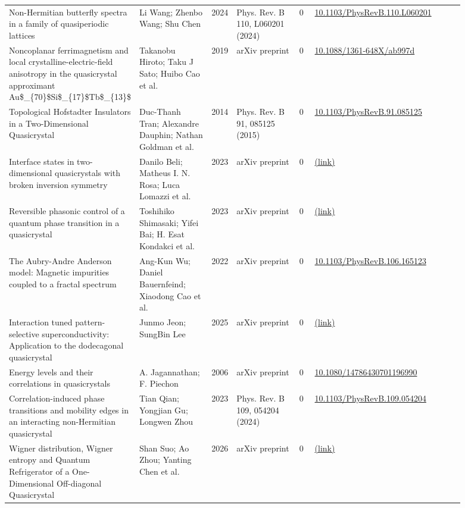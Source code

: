 \documentclass[10pt,a4paper]{article}
\begin{document}
{\begin{longtable}{p{0.192\linewidth}p{0.192\linewidth}p{0.043\linewidth}p{0.192\linewidth}p{0.043\linewidth}p{0.132\linewidth}p{0.096\linewidth}}
Non-Hermitian butterfly spectra in a family of quasiperiodic lattices & Li Wang; Zhenbo Wang; Shu Chen & 2024 & Phys. Rev. B 110, L060201 (2024) & 0 & \href{https://doi.org/10.1103/PhysRevB.110.L060201}{10.1103/PhysRevB.110.L060201} &  \\
Noncoplanar ferrimagnetism and local crystalline-electric-field anisotropy in the quasicrystal approximant Au\$\_\{70\}\$Si\$\_\{17\}\$Tb\$\_\{13\}\$ & Takanobu Hiroto; Taku J Sato; Huibo Cao et al. & 2019 & arXiv preprint & 0 & \href{https://doi.org/10.1088/1361-648X/ab997d}{10.1088/1361-648X/ab997d} &  \\
Topological Hofstadter Insulators in a Two-Dimensional Quasicrystal & Duc-Thanh Tran; Alexandre Dauphin; Nathan Goldman et al. & 2014 & Phys. Rev. B 91, 085125 (2015) & 0 & \href{https://doi.org/10.1103/PhysRevB.91.085125}{10.1103/PhysRevB.91.085125} &  \\
Interface states in two-dimensional quasicrystals with broken inversion symmetry & Danilo Beli; Matheus I. N. Rosa; Luca Lomazzi et al. & 2023 & arXiv preprint & 0 & \href{http://arxiv.org/abs/2304.09628v1}{(link)} &  \\
Reversible phasonic control of a quantum phase transition in a quasicrystal & Toshihiko Shimasaki; Yifei Bai; H. Esat Kondakci et al. & 2023 & arXiv preprint & 0 & \href{http://arxiv.org/abs/2312.00976v1}{(link)} &  \\
The Aubry-Andre Anderson model: Magnetic impurities coupled to a fractal spectrum & Ang-Kun Wu; Daniel Bauernfeind; Xiaodong Cao et al. & 2022 & arXiv preprint & 0 & \href{https://doi.org/10.1103/PhysRevB.106.165123}{10.1103/PhysRevB.106.165123} &  \\
Interaction tuned pattern-selective superconductivity: Application to the dodecagonal quasicrystal & Junmo Jeon; SungBin Lee & 2025 & arXiv preprint & 0 & \href{http://arxiv.org/abs/2503.14593v2}{(link)} &  \\
Energy levels and their correlations in quasicrystals & A. Jagannathan; F. Piechon & 2006 & arXiv preprint & 0 & \href{https://doi.org/10.1080/14786430701196990}{10.1080/14786430701196990} &  \\
Correlation-induced phase transitions and mobility edges in an interacting non-Hermitian quasicrystal & Tian Qian; Yongjian Gu; Longwen Zhou & 2023 & Phys. Rev. B 109, 054204 (2024) & 0 & \href{https://doi.org/10.1103/PhysRevB.109.054204}{10.1103/PhysRevB.109.054204} &  \\
Wigner distribution, Wigner entropy and Quantum Refrigerator of a One-Dimensional Off-diagonal Quasicrystal & Shan Suo; Ao Zhou; Yanting Chen et al. & 2026 & arXiv preprint & 0 & \href{http://arxiv.org/abs/2601.17691v1}{(link)} &  \\

\end{longtable}}
\end{document}
